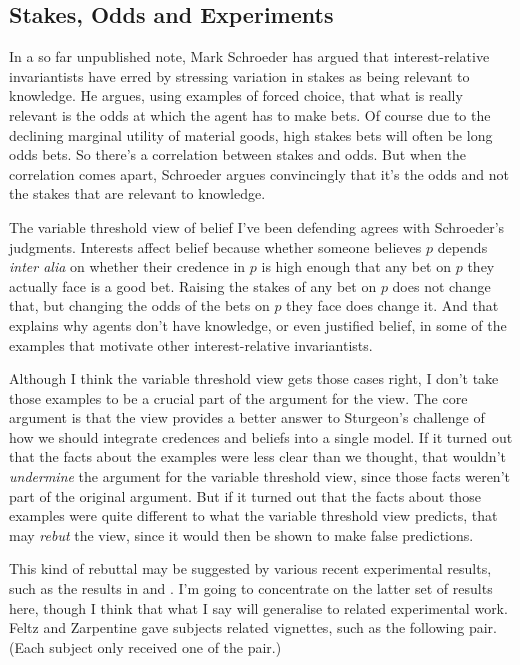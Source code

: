 \subsection{Stakes, Odds and Experiments}

In a so far unpublished note, Mark Schroeder \citeyearpar{SchroederStakes} has argued that interest-relative invariantists have erred by stressing variation in stakes as being relevant to knowledge. He argues, using examples of forced choice, that what is really relevant is the odds at which the agent has to make bets. Of course due to the declining marginal utility of material goods, high stakes bets will often be long odds bets. So there's a correlation between stakes and odds. But when the correlation comes apart, Schroeder argues convincingly that it's the odds and not the stakes that are relevant to knowledge.

The variable threshold view of belief I've been defending agrees with Schroeder's judgments. Interests affect belief because  whether someone believes \(p\) depends \textit{inter alia} on whether their credence in \(p\) is high enough that any bet on \(p\) they actually face is a good bet. Raising the stakes of any bet on \(p\) does not change that, but changing the odds of the bets on \(p\) they face does change it. And that explains why agents don't have knowledge, or even justified belief, in some of the examples that motivate other interest-relative invariantists.

Although I think the variable threshold view gets those cases right, I don't take those examples to be a crucial part of the argument for the view. The core argument is that the view provides a better answer to Sturgeon's challenge of how we should integrate credences and beliefs into a single model. If it turned out that the facts about the examples were less clear than we thought, that wouldn't \textit{undermine} the argument for the variable threshold view, since those facts weren't part of the original argument. But if it turned out that the facts about those examples were quite different to what the variable threshold view predicts, that may \textit{rebut} the view, since it would then be shown to make false predictions.

This kind of rebuttal may be suggested by various recent experimental results, such as the results in \cite{May2010} and \cite{FeltzZarpentine2010}. I'm going to concentrate on the latter set of results here, though I think that what I say will generalise to related experimental work. Feltz and Zarpentine gave subjects related vignettes, such as the following pair. (Each subject only received one of the pair.)

